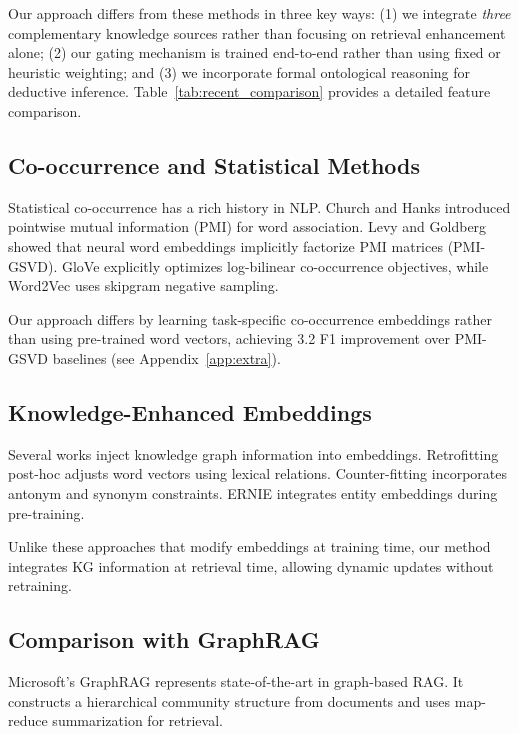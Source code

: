 \documentclass[10pt,twocolumn]{article}
\begin{document}
Our approach differs from these methods in three key ways: (1) we integrate \textit{three} complementary knowledge sources rather than focusing on retrieval enhancement alone; (2) our gating mechanism is trained end-to-end rather than using fixed or heuristic weighting; and (3) we incorporate formal ontological reasoning for deductive inference. Table~\ref{tab:recent_comparison} provides a detailed feature comparison.

\subsection{Co-occurrence and Statistical Methods}
\label{sec:cooccur_related}

Statistical co-occurrence has a rich history in NLP. Church and Hanks \cite{church1990pmi} introduced pointwise mutual information (PMI) for word association. Levy and Goldberg \cite{levy2014neural} showed that neural word embeddings implicitly factorize PMI matrices (PMI-GSVD). GloVe \cite{pennington2014glove} explicitly optimizes log-bilinear co-occurrence objectives, while Word2Vec \cite{mikolov2013word2vec} uses skipgram negative sampling.

Our approach differs by learning task-specific co-occurrence embeddings rather than using pre-trained word vectors, achieving 3.2 F1 improvement over PMI-GSVD baselines (see Appendix~\ref{app:extra}).

\subsection{Knowledge-Enhanced Embeddings}
\label{sec:retrofit_related}

Several works inject knowledge graph information into embeddings. Retrofitting \cite{faruqui2015retrofitting} post-hoc adjusts word vectors using lexical relations. Counter-fitting \cite{mrksic2016counter} incorporates antonym and synonym constraints. ERNIE \cite{zhang2019ernie} integrates entity embeddings during pre-training.

Unlike these approaches that modify embeddings at training time, our method integrates KG information at retrieval time, allowing dynamic updates without retraining.

\subsection{Comparison with GraphRAG}
\label{sec:graphrag}

Microsoft's GraphRAG \cite{edge2024graphrag,microsoft2024graphrag} represents state-of-the-art in graph-based RAG. It constructs a hierarchical community structure from documents and uses map-reduce summarization for retrieval.
\end{document}

